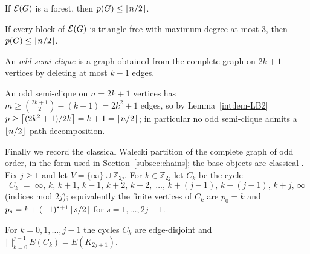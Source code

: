 \begin{theorem}\label{int:thm-pyber}
If $\mathcal{E}(G)$ is a forest, then $p(G)\le \left\lfloor n/2 \right\rfloor$.
\end{theorem}

\begin{theorem}\label{int:thm-fan}
If every block of $\mathcal{E}(G)$ is triangle-free with maximum degree at most $3$, then
$p(G)\le \left\lfloor n/2 \right\rfloor$.
\end{theorem}

\begin{definition}\label{int:def-osc}
An \emph{odd semi-clique} is a graph obtained from the complete graph on $2k+1$ vertices by
deleting at most $k-1$ edges.
\end{definition}

\begin{observation}\label{int:obs-density}
An odd semi-clique on $n=2k+1$ vertices has
$m\ge \binom{2k+1}{2}-(k-1)=2k^2+1$ edges, so by Lemma~\ref{int:lem-LB2}
$p\ge \left\lceil (2k^2+1)/2k \right\rceil=k+1=\left\lceil n/2 \right\rceil$; in particular no odd semi-clique admits a
$\left\lfloor n/2 \right\rfloor$-path decomposition.
\end{observation}

Finally we record the classical Walecki partition of the complete graph of odd order, in
the form used in Section~\ref{subsec:chains}; the base objects are classical
\cite{LP92,Alspach08}. Fix $j\ge 1$ and let $V=\{\infty\}\cup \mathbb{Z}_{2j}$. For
$k\in\mathbb{Z}_{2j}$ let $C_k$ be the cycle
\[
C_k \;=\; \infty,\, k,\, k+1,\, k-1,\, k+2,\, k-2,\;\dots,\, k+(j-1),\, k-(j-1),\, k+j,\, \infty
\]
(indices mod $2j$); equivalently the finite vertices of $C_k$ are $p_0=k$ and
$p_s=k+(-1)^{s+1}\left\lceil s/2 \right\rceil$ for $s=1,\dots,2j-1$.

\begin{lemma}\label{int:lem-walecki}
For $k=0,1,\dots,j-1$ the cycles $C_k$ are edge-disjoint and
$\bigsqcup_{k=0}^{j-1}E(C_k)=E(K_{2j+1})$.
\end{lemma}

